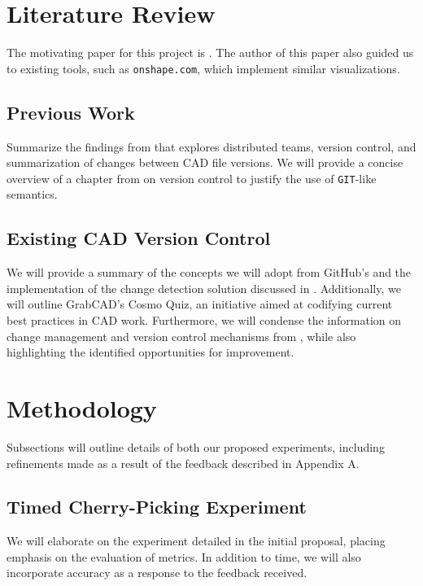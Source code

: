 \documentclass[sigconf,authorversion,nonacm]{acmart}
\begin{document}
\section{Literature Review}

The motivating paper for this project is \citet{cheng2023age}. The author of this paper also guided us to existing tools, such as \texttt{onshape.com}, which implement similar visualizations.

\subsection{Previous Work}
Summarize the findings from \citet{cheng2023age}  that explores distributed teams, version control, 
and summarization of changes between CAD file versions. We will provide a concise overview of a chapter from \citet{Frazelle_2021} on version control to justify the use of \texttt{GIT}-like semantics.

\subsection{Existing CAD Version Control}
We will provide a summary of the concepts we will adopt from GitHub's \citet{github_blog_2013} 
and the implementation of the change detection solution discussed in \citet{3drepo_blog}. 
Additionally, we will outline GrabCAD's Cosmo Quiz\cite{revisions_2014}, an initiative aimed at codifying current best practices in CAD work. 
Furthermore, we will condense the information on change management and version control mechanisms from \citet{Bricogne_Rivest_Troussier_Eynard_2012}, while also highlighting the identified opportunities for improvement.

\section{Methodology}

Subsections will outline details of both our proposed experiments, including refinements made as a result of the feedback described in Appendix A.

\subsection{Timed Cherry-Picking Experiment}

We will elaborate on the experiment detailed in the initial proposal, placing emphasis on the evaluation of metrics. In addition to time, we will also incorporate accuracy as a response to the feedback received.
\end{document}
